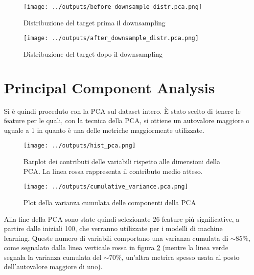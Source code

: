 \begin{figure}[!htb]
    \begin{minipage}{0.48\textwidth}
      \centering
      \texttt{[image: ../outputs/before\_downsample\_distr.pca.png]}
      \caption{Distribuzione del target prima il downsampling}
      \label{Fig:Data1}
    \end{minipage}\hfill
    \begin{minipage}{0.48\textwidth}
      \centering
      \texttt{[image: ../outputs/after\_downsample\_distr.pca.png]}
      \caption{Distribuzione del target dopo il downsampling}
      \label{Fig:Data2}
    \end{minipage}
\end{figure}

\section{Principal Component Analysis}
Si è quindi proceduto con la PCA sul dataset intero. È stato scelto di tenere 
le feature per le quali, con la tecnica della PCA, si ottiene un autovalore
maggiore o uguale a 1 in quanto è una delle metriche maggiormente utilizzate.
\begin{figure}[H]
    \centering
    \texttt{[image: ../outputs/hist\_pca.png]}
    \caption{Barplot dei contributi delle variabili rispetto alle dimensioni 
    della PCA. La linea rossa rappresenta il contributo medio atteso.}
\end{figure}
\begin{figure}[H]
    \centering
    \texttt{[image: ../outputs/cumulative\_variance.pca.png]}
    \caption{Plot della varianza cumulata delle componenti della PCA}
    \label{fig:var}
\end{figure}
Alla fine della PCA sono state quindi selezionate 26 feature più significative,
a partire dalle iniziali 100, che verranno utilizzate per i modelli di machine 
learning. Queste numero di variabili comportano una varianza cumulata di 
$\sim 85\%$, come segnalato dalla linea verticale rossa in figura \ref{fig:var}
(mentre la linea verde segnala la varianza cumulata del $\sim 70\%$, un'altra
metrica spesso usata al posto dell'autovalore maggiore di uno).
